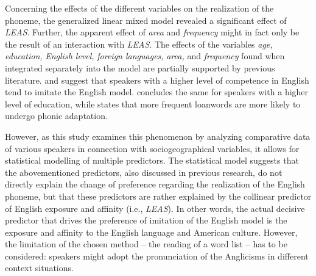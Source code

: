\documentclass[output=paper]{langscibook}
\begin{document}
Concerning the effects of the different variables on the realization of the phoneme, the generalized linear mixed model revealed a significant effect of \textit{\gls*{LEAS}}. Further, the apparent effect of \textit{area} and \textit{frequency} might in fact only be the result of an interaction with \textit{\gls*{LEAS}}. The effects of the variables \textit{age,} \textit{education,} \textit{English level,} \textit{foreign languages,} \textit{area,} and \textit{frequency} found when integrated separately into the model are partially supported by previous literature. \citet[127]{RodriguezGonzalez2017} and \citet[42]{GomezCapuz2001} suggest that speakers with a higher level of competence in English tend to imitate the English model. \citet[102, 123]{RodriguezGonzalez2017} concludes the same for speakers with a higher level of education, while \citet[354]{RodriguezGonzalez2018} states that more frequent loanwords are more likely to undergo phonic adaptation.

However, as this study examines this phenomenon by analyzing comparative data of various speakers in connection with sociogeographical variables, it allows for statistical modelling of multiple predictors. The statistical model suggests that the abovementioned predictors, also discussed in previous research, do not directly explain the change of preference regarding the realization of the English phoneme, but that these predictors are rather explained by the collinear predictor of English exposure and affinity (i.e., \textit{\gls*{LEAS}}). In other words, the actual decisive predictor that drives the preference of imitation of the English model is the exposure and affinity to the English language and American culture. However, the limitation of the chosen method – the reading of a word list – has to be considered: speakers might adopt the pronunciation of the Anglicisms in different context situations.
\end{document}

